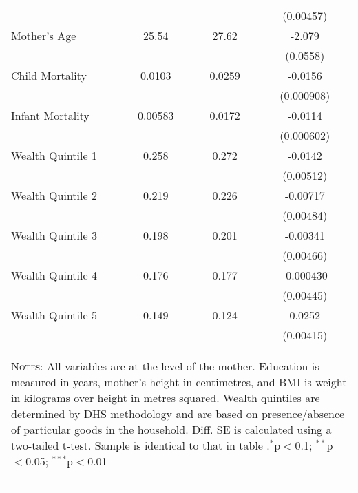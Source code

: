 \begin{table}[htbp]
\begin{tabular}{l*{1}{ccc}}
                    &            &            &   (0.00457)         \\
Mother's Age        &       25.54&       27.62&      -2.079\sym{***}\\
                    &            &            &    (0.0558)         \\
Child Mortality     &      0.0103&      0.0259&     -0.0156\sym{***}\\
                    &            &            &  (0.000908)         \\
Infant Mortality    &     0.00583&      0.0172&     -0.0114\sym{***}\\
                    &            &            &  (0.000602)         \\
Wealth Quintile 1   &       0.258&       0.272&     -0.0142\sym{**} \\
                    &            &            &   (0.00512)         \\
Wealth Quintile 2   &       0.219&       0.226&    -0.00717         \\
                    &            &            &   (0.00484)         \\
Wealth Quintile 3   &       0.198&       0.201&    -0.00341         \\
                    &            &            &   (0.00466)         \\
Wealth Quintile 4   &       0.176&       0.177&   -0.000430         \\
                    &            &            &   (0.00445)         \\
Wealth Quintile 5   &       0.149&       0.124&      0.0252\sym{***}\\
                    &            &            &   (0.00415)         \\
\midrule\midrule


\multicolumn{4}{p{10.4cm}}{\begin{footnotesize}\textsc{Notes:} All variables are at the level of the mother.  Education is measured in years, mother's height in centimetres, and BMI is weight in kilograms over height in metres squared.  Wealth quintiles are determined by DHS methodology and are based on presence/absence of particular goods in the household. Diff. SE is calculated using a two-tailed t-test.  Sample is identical to that in table \label{TWINtab:sumstats}.$^{*}$p$<$0.1; $^{**}$p$<$0.05; $^{***}$p$<$0.01\end{footnotesize}}
\\\bottomrule\normalsize\end{tabular}\end{table} 
